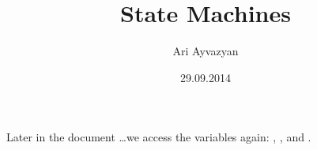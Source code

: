 \documentclass[12pt,a4paper,draft]{report}
\date{29.09.2014}
\author{Ari Ayvazyan}
\title{State Machines}
\begin{document}
\maketitle

Later in the document \ldots we access the variables again:
\MyTitle, \MyAuthor, and \MyDate.
\end{document}
